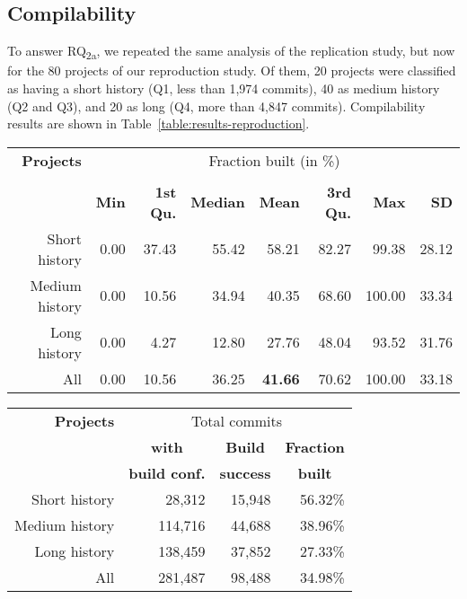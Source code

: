 
\subsection{Compilability}

To answer RQ\textsubscript{2a}, we repeated the same analysis of the replication study, but now for the 80 projects of our reproduction study. Of them, 20 projects were classified as having a short history (Q1, less than 1,974 commits), 40 as medium history (Q2 and Q3), and 20 as long (Q4, more than 4,847 commits). Compilability results are shown in Table~\ref{table:results-reproduction}.

\begin{table*}[h]
\caption{Reproduction study - Compilability results}
\label{table:results-reproduction}


\begin{center}
\begin{tabular}{r|rrrrrrr}
\toprule
  \bf{Projects} & \multicolumn{7}{c}{Fraction built (in \%)}\\
                & \multicolumn{7}{c}{} \\
                & \bf{Min} & \bf{1st Qu.} & \bf{Median} & \bf{Mean} & \bf{3rd Qu.} & \bf{Max} & \bf{SD} \\    
\midrule
Short history  & 0.00     & 37.43        & 55.42       & 58.21          & 82.27 &  99.38 & 28.12 \\
Medium history & 0.00     & 10.56        & 34.94       & 40.35          & 68.60 & 100.00 & 33.34 \\
Long history   & 0.00     & 4.27        & 12.80       & 27.76          & 48.04 &  93.52 & 31.76 \\
\midrule
All            & 0.00     & 10.56        & 36.25       & \textbf{41.66} & 70.62 & 100.00 & 33.18 \\
\bottomrule
\end{tabular}
\end{center}

\begin{center}
\begin{tabular}{r|rrr}
\toprule
  \bf{Projects} & \multicolumn{3}{c}{Total commits} \\
                & \multicolumn{1}{c}{\bf{with}} & \multicolumn{1}{c}{\bf{Build}} & \multicolumn{1}{c}{\bf{Fraction}} \\
                & \bf{build conf.} & \bf{success} & \multicolumn{1}{c}{\bf{built}}\\    
\midrule
Short history  & 28,312 & 15,948 & 56.32\%\\
Medium history & 114,716 & 44,688 & 38.96\%\\
Long history   & 138,459 & 37,852 & 27.33\%\\
\midrule
All            & 281,487	 & 98,488	 & 34.98\%\\
\bottomrule
\end{tabular}
\end{center}

\end{table*}

